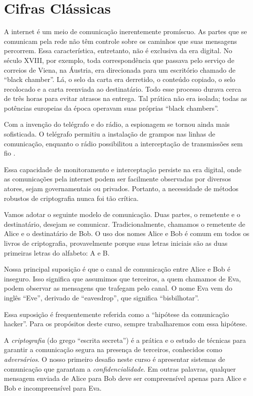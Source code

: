 ﻿\chapter{Cifras Clássicas}
\label{cha:cifras-classicas}

A internet é um meio de comunicação inerentemente promíscuo.
As partes que se comunicam pela rede não têm controle sobre os caminhos que suas mensagens percorrem.
Essa característica, entretanto, não é exclusiva da era digital.
No século XVIII, por exemplo, toda correspondência que passava pelo serviço de correios de Viena, na Áustria, era direcionada para um escritório chamado de ``black chamber''.
Lá, o selo da carta era derretido, o conteúdo copiado, o selo recolocado e a carta reenviada ao destinatário.
Todo esse processo durava cerca de três horas para evitar atrasos na entrega.
Tal prática não era isolada; todas as potências europeias da época operavam suas próprias ``black chambers''.

Com a invenção do telégrafo e do rádio, a espionagem se tornou ainda mais sofisticada.
O telégrafo permitiu a instalação de grampos nas linhas de comunicação, enquanto o rádio possibilitou a interceptação de transmissões sem fio \cite{Kahn96}.

Essa capacidade de monitoramento e interceptação persiste na era digital, onde as comunicações pela internet podem ser facilmente observadas por diversos atores, sejam governamentais ou privados.
Portanto, a necessidade de métodos robustos de criptografia nunca foi tão crítica.

Vamos adotar o seguinte modelo de comunicação. Duas partes, o remetente e o destinatário, desejam se comunicar.
Tradicionalmente, chamamos o remetente de Alice e o destinatário de Bob.
O uso dos nomes Alice e Bob é comum em todos os livros de criptografia, provavelmente porque suas letras iniciais são as duas primeiras letras do alfabeto: A e B.

Nossa principal suposição é que o canal de comunicação entre Alice e Bob é inseguro.
Isso significa que assumimos que terceiros, a quem chamamos de Eva, podem observar as mensagens que trafegam pelo canal.
O nome Eva vem do inglês ``Eve'', derivado de ``eavesdrop'', que significa ``bisbilhotar''.

Essa suposição é frequentemente referida como a ``hipótese da comunicação hacker''.
Para os propósitos deste curso, sempre trabalharemos com essa hipótese.

A {\em criptografia} (do grego ``escrita secreta'') é a prática e o estudo de técnicas para garantir a comunicação segura na presença de terceiros, conhecidos como {\em adversários}.
O nosso primeiro desafio neste curso é apresentar sistemas de comunicação que garantam a {\em confidencialidade}.
Em outras palavras, qualquer mensagem enviada de Alice para Bob deve ser compreensível apenas para Alice e Bob e incompreensível para Eva.


